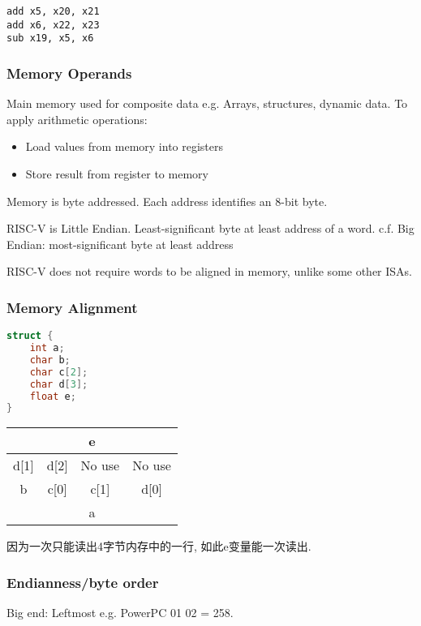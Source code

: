 \begin{lstlisting}[language={[x86masm]Assembler},title={Compiled RISC-V code}]
add x5, x20, x21
add x6, x22, x23
sub x19, x5, x6
\end{lstlisting}


\subsubsection{Memory Operands}
Main memory used for composite data e.g. Arrays, structures, dynamic data. 
To apply arithmetic operations: 
\begin{itemize}
    \item\small Load values from memory into registers
    \item\small Store result from register to memory
\end{itemize}

Memory is byte addressed. Each address identifies an 8-bit byte. 

RISC-V is Little Endian. Least-significant byte at least address of a word. c.f. Big Endian: most-significant byte at least address

RISC-V does not require words to be aligned in memory, unlike some other ISAs. 

\subsubsection{Memory Alignment}
\begin{lstlisting}[language=c]
struct {
    int a;
    char b;
    char c[2];
    char d[3];
    float e;
}
\end{lstlisting}

\begin{table}[!htb]
    \centering
    \begin{tabular}[c]{|c|c|c|c|}\hline
        \multicolumn{4}{|c|}{e}\\ \hline
        d[1] & d[2] & No use & No use \\ \hline
        b & c[0] & c[1] & d[0] \\ \hline
        \multicolumn{4}{|c|}{a}\\ \hline
    \end{tabular}
\end{table}


因为一次只能读出4字节内存中的一行, 如此e变量能一次读出. 

\subsubsection{Endianness/byte order}
Big end: Leftmost e.g. PowerPC 01 02 = 258. 

